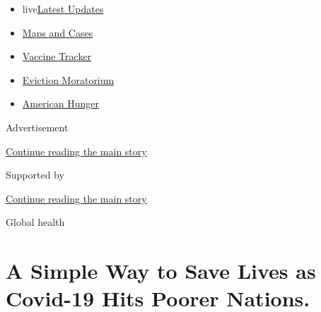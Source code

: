 \begin{itemize}
\tightlist
\item
  live\href{https://www.nytimes3xbfgragh.onion/2020/09/08/world/covid-19-coronavirus.html?name=styln-coronavirus-national\&region=TOP_BANNER\&block=storyline_menu_recirc\&action=click\&pgtype=Article\&impression_id=13887c51-f1c3-11ea-9feb-8792ec8b6371\&variant=undefined}{Latest
  Updates}
\item
  \href{https://www.nytimes3xbfgragh.onion/interactive/2020/us/coronavirus-us-cases.html?name=styln-coronavirus-national\&region=TOP_BANNER\&block=storyline_menu_recirc\&action=click\&pgtype=Article\&impression_id=13887c52-f1c3-11ea-9feb-8792ec8b6371\&variant=undefined}{Maps
  and Cases}
\item
  \href{https://www.nytimes3xbfgragh.onion/interactive/2020/science/coronavirus-vaccine-tracker.html?name=styln-coronavirus-national\&region=TOP_BANNER\&block=storyline_menu_recirc\&action=click\&pgtype=Article\&impression_id=1388a360-f1c3-11ea-9feb-8792ec8b6371\&variant=undefined}{Vaccine
  Tracker}
\item
  \href{https://www.nytimes3xbfgragh.onion/2020/09/02/your-money/eviction-moratorium-covid.html?name=styln-coronavirus-national\&region=TOP_BANNER\&block=storyline_menu_recirc\&action=click\&pgtype=Article\&impression_id=1388a361-f1c3-11ea-9feb-8792ec8b6371\&variant=undefined}{Eviction
  Moratorium}
\item
  \href{https://www.nytimes3xbfgragh.onion/interactive/2020/09/02/magazine/food-insecurity-hunger-us.html?name=styln-coronavirus-national\&region=TOP_BANNER\&block=storyline_menu_recirc\&action=click\&pgtype=Article\&impression_id=1388a362-f1c3-11ea-9feb-8792ec8b6371\&variant=undefined}{American
  Hunger}
\end{itemize}

Advertisement

\protect\hyperlink{after-top}{Continue reading the main story}

Supported by

\protect\hyperlink{after-sponsor}{Continue reading the main story}

Global health

\hypertarget{a-simple-way-to-save-lives-as-covid-19-hits-poorer-nations}{%
\section{A Simple Way to Save Lives as Covid-19 Hits Poorer
Nations.}\label{a-simple-way-to-save-lives-as-covid-19-hits-poorer-nations}}

